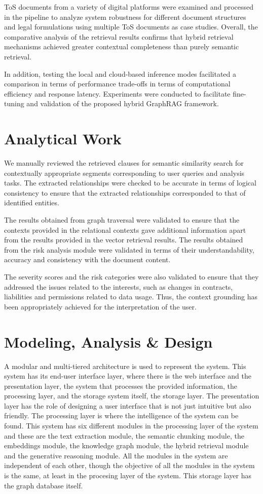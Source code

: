ToS documents from a variety of digital platforms were examined and processed in the pipeline to analyze
system robustness for different document structures and legal formulations using multiple ToS documents as
case studies.
Overall, the comparative analysis of the retrieval results confirms that hybrid retrieval mechanisms achieved
greater contextual completeness than purely semantic retrieval.

In addition, testing the local and cloud-based inference modes facilitated a comparison in terms of performance trade-offs in terms of computational efficiency and response latency.
Experiments were conducted to facilitate fine-tuning and validation of the proposed hybrid GraphRAG framework.

\section{Analytical Work}
We manually reviewed the retrieved clauses for semantic similarity search for contextually appropriate
segments corresponding to user queries and analysis tasks.
The extracted relationships were checked to be accurate in terms of logical consistency to ensure that the
extracted relationships corresponded to that of identified entities.

The results obtained from graph traversal were validated to ensure that the contexts provided in the relational contexts gave additional information apart from the results provided in the vector retrieval results.
The results obtained from the risk analysis module were validated in terms of their understandability, accuracy and consistency with the document content.

The severity scores and the risk categories were also validated to ensure that they addressed the issues related to the interests, such as changes in contracts, liabilities and permissions related to data usage. Thus, the context grounding has been appropriately achieved for the interpretation of the user.

\section{Modeling, Analysis \& Design}
A modular and multi-tiered architecture is used to represent the
system.
This system has its end-user interface layer, where there is the web interface and the presentation layer, the system that processes the provided information, the processing layer, and the storage system itself, the storage layer.
The presentation layer has the role of designing a user interface that is not just intuitive but also friendly.
The processing layer is where the intelligence of the system can be found.
This system has six different modules in the processing layer of the system and these are the text extraction module, the semantic chunking module, the embeddings module, the knowledge graph module, the hybrid retrieval module and the generative reasoning module.
All the modules in the system are independent of each other, though the objective of all the modules in the system is the same, at least in the procesing layer of the system.
This storage layer has the graph database itself.

